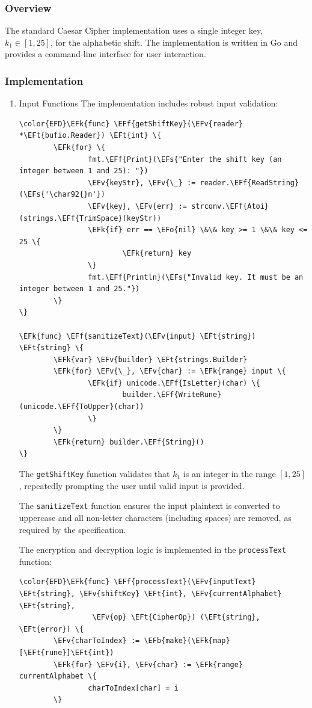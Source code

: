 \documentclass[a4paper,12pt]{article}
\newcommand{\EFs}[1]{\textcolor{EFs}{#1}} %
\newcommand{\EFk}[1]{\textcolor{EFk}{#1}} %
\newcommand{\EFb}[1]{\textcolor{EFb}{#1}} %
\newcommand{\EFf}[1]{\textcolor{EFf}{#1}} %
\newcommand{\EFv}[1]{\textcolor{EFv}{#1}} %
\newcommand{\EFt}[1]{\textcolor{EFt}{#1}} %
\newcommand{\EFo}[1]{\textcolor{EFo}{#1}} %
\begin{document}
\subsubsection{Overview}
\label{sec:orga64c2bf}
The standard Caesar Cipher implementation uses a single integer key, \(k_{1} \in [1, 25]\), for the alphabetic shift. The implementation is written in Go and provides a command-line interface for user interaction.
\subsubsection{Implementation}
\label{sec:org34a61d1}
\begin{enumerate}
\item Input Functions
\label{sec:org6983097}
The implementation includes robust input validation:
\begin{Code}
\begin{Verbatim}
\color{EFD}\EFk{func} \EFf{getShiftKey}(\EFv{reader} *\EFt{bufio.Reader}) \EFt{int} \{
        \EFk{for} \{
                fmt.\EFf{Print}(\EFs{"Enter the shift key (an integer between 1 and 25): "})
                \EFv{keyStr}, \EFv{\_} := reader.\EFf{ReadString}(\EFs{'\char92{}n'})
                \EFv{key}, \EFv{err} := strconv.\EFf{Atoi}(strings.\EFf{TrimSpace}(keyStr))
                \EFk{if} err == \EFo{nil} \&\& key >= 1 \&\& key <= 25 \{
                        \EFk{return} key
                \}
                fmt.\EFf{Println}(\EFs{"Invalid key. It must be an integer between 1 and 25."})
        \}
\}

\EFk{func} \EFf{sanitizeText}(\EFv{input} \EFt{string}) \EFt{string} \{
        \EFk{var} \EFv{builder} \EFt{strings.Builder}
        \EFk{for} \EFv{\_}, \EFv{char} := \EFk{range} input \{
                \EFk{if} unicode.\EFf{IsLetter}(char) \{
                        builder.\EFf{WriteRune}(unicode.\EFf{ToUpper}(char))
                \}
        \}
        \EFk{return} builder.\EFf{String}()
\}
\end{Verbatim}
\end{Code}
The \texttt{getShiftKey} function validates that \(k_{1}\) is an integer in the range \([1, 25]\), repeatedly prompting the user until valid input is provided.

The \texttt{sanitizeText} function ensures the input plaintext is converted to uppercase and all non-letter characters (including spaces) are removed, as required by the specification.

The encryption and decryption logic is implemented in the \texttt{processText} function:
\begin{Code}
\begin{Verbatim}
\color{EFD}\EFk{func} \EFf{processText}(\EFv{inputText} \EFt{string}, \EFv{shiftKey} \EFt{int}, \EFv{currentAlphabet} \EFt{string}, 
                 \EFv{op} \EFt{CipherOp}) (\EFt{string}, \EFt{error}) \{
        \EFv{charToIndex} := \EFb{make}(\EFk{map}[\EFt{rune}]\EFt{int})
        \EFk{for} \EFv{i}, \EFv{char} := \EFk{range} currentAlphabet \{
                charToIndex[char] = i
        \}


\end{Verbatim}
\end{Code}
\end{enumerate}
\end{document}
